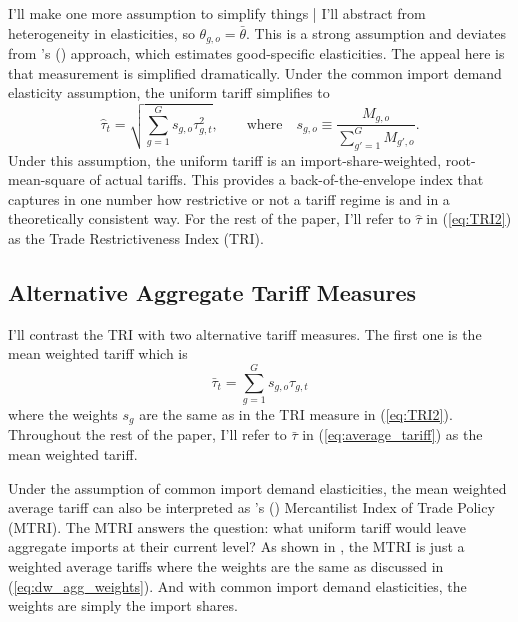 \documentclass[12pt,pdftex]{article}
\def\citeapos#1{\citeauthor{#1}'s (\citeyear{#1})}
\begin{document}
\begin{onehalfspacing}
I'll make one more assumption to simplify things | I'll abstract from heterogeneity in elasticities, so $\theta_{g,o} = \bar \theta$. This is a strong assumption and deviates from \citeapos{keeNicitaOlarreaga2009} approach, which estimates good-specific elasticities. The appeal here is that measurement is simplified dramatically. Under the common import demand elasticity assumption, the uniform tariff simplifies to
\begin{equation}
\hat{\tau}_t = \sqrt{\sum_{g=1}^G s_{g,o} \tau_{g,t}^2}, \quad \quad \mbox{where} \quad s_{g,o} \equiv \frac{M_{g,o}}{\sum\limits_{g'=1}^G  M_{g',o}}.
\label{eq:TRI2}
\end{equation}
Under this assumption, the uniform tariff is an import-share-weighted, root-mean-square of actual tariffs. This provides a back-of-the-envelope index that captures in one number how restrictive or not a tariff regime is and in a theoretically consistent way. For the rest of the paper, I'll refer to $\hat \tau$ in (\ref{eq:TRI2}) as the Trade Restrictiveness Index (TRI).

\subsection{Alternative Aggregate Tariff Measures}

I'll contrast the TRI with two alternative tariff measures. The first one is the mean weighted tariff which is
\begin{equation}
\bar{\tau}_{t} = \sum_{g=1}^G s_{g,o} \tau_{g,t}
\label{eq:average_tariff}
\end{equation}
where the weights $s_g$ are the same as in the TRI measure in (\ref{eq:TRI2}). Throughout the rest of the paper, I'll refer to $\bar{\tau}$ in (\ref{eq:average_tariff}) as the mean weighted tariff.

Under the assumption of common import demand elasticities, the mean weighted average tariff can also be interpreted as \citeapos{anderson2003mercantilist} Mercantilist Index of Trade Policy (MTRI). The MTRI answers the question: what uniform tariff would leave aggregate imports at their current level? As shown in \citet{keeNicitaOlarreaga2009}, the MTRI is just a weighted average tariffs where the weights are the same as discussed in (\ref{eq:dw_agg_weights}). And with common import demand elasticities, the weights are simply the import shares.


\end{onehalfspacing}
\end{document}
